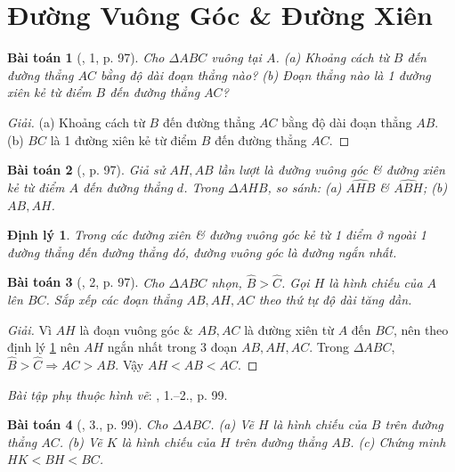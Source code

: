 \documentclass{article}
\newtheorem{baitoan}{Bài toán}
\newtheorem{dinhly}{Định lý}
\begin{document}

\section{Đường Vuông Góc \& Đường Xiên}

\begin{baitoan}[\cite{SGK_Toan_7_Canh_Dieu_tap_2}, 1, p. 97]
	Cho $\Delta ABC$ vuông tại $A$. (a) Khoảng cách từ $B$ đến đường thẳng $AC$ bằng độ dài đoạn thẳng nào? (b) Đoạn thẳng nào là 1 đường xiên kẻ từ điểm $B$ đến đường thẳng $AC$?
\end{baitoan}

\begin{proof}[Giải]
	(a) Khoảng cách từ $B$ đến đường thẳng $AC$ bằng độ dài đoạn thẳng $AB$. (b) $BC$ là 1 đường xiên kẻ từ điểm $B$ đến đường thẳng $AC$.
\end{proof}

\begin{baitoan}[\cite{SGK_Toan_7_Canh_Dieu_tap_2}, p. 97]
	Giả sử $AH,AB$ lần lượt là đường vuông góc \& đường xiên kẻ từ điểm $A$ đến đường thẳng $d$. Trong $\Delta AHB$, so sánh: (a) $\widehat{AHB}$ \& $\widehat{ABH}$; (b) $AB,AH$.
\end{baitoan}

\begin{dinhly}
	\label{thm: duong vuong goc vs. duong xien}
	Trong các đường xiên \& đường vuông góc kẻ từ 1 điểm ở ngoài 1 đường thẳng đến đường thẳng đó, đường vuông góc là đường ngắn nhất.
\end{dinhly}

\begin{baitoan}[\cite{SGK_Toan_7_Canh_Dieu_tap_2}, 2, p. 97]
	Cho $\Delta ABC$ nhọn, $\widehat{B} > \widehat{C}$. Gọi $H$ là hình chiếu của $A$ lên $BC$. Sắp xếp các đoạn thẳng $AB,AH,AC$ theo thứ tự độ dài tăng dần.
\end{baitoan}

\begin{proof}[Giải]
	Vì $AH$ là đoạn vuông góc \& $AB,AC$ là đường xiên từ $A$ đến $BC$, nên theo định lý \ref{thm: duong vuong goc vs. duong xien} nên $AH$ ngắn nhất trong 3 đoạn $AB,AH,AC$. Trong $\Delta ABC$, $\widehat{B} > \widehat{C}\Rightarrow AC > AB$. Vậy $AH < AB < AC$. 
\end{proof}
\noindent\textit{Bài tập phụ thuộc hình vẽ}: \cite{SGK_Toan_7_Canh_Dieu_tap_2}, 1.--2., p. 99.

\begin{baitoan}[\cite{SGK_Toan_7_Canh_Dieu_tap_2}, 3., p. 99]
	Cho $\Delta ABC$. (a) Vẽ $H$ là hình chiếu của $B$ trên đường thẳng $AC$. (b) Vẽ $K$ là hình chiếu của $H$ trên đường thẳng $AB$. (c) Chứng minh $HK < BH < BC$.
\end{baitoan}
\end{document}
